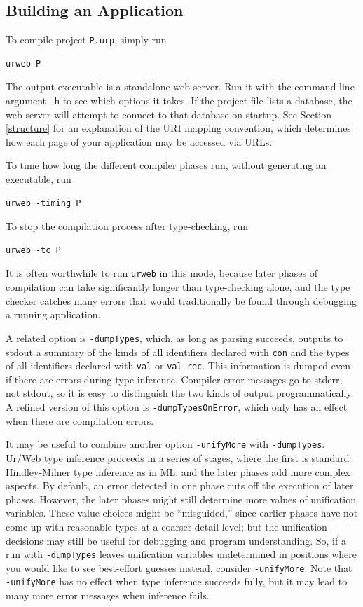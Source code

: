 \documentclass{article}
\newcommand{\cd}[1]{\texttt{#1}}
\begin{document}
\subsection{Building an Application}
\label{sec:building}

To compile project \texttt{P.urp}, simply run
\begin{verbatim}
urweb P
\end{verbatim}
The output executable is a standalone web server.  Run it with the command-line argument \texttt{-h} to see which options it takes.  If the project file lists a database, the web server will attempt to connect to that database on startup.  See Section \ref{structure} for an explanation of the URI mapping convention, which determines how each page of your application may be accessed via URLs.

To time how long the different compiler phases run, without generating an executable, run
\begin{verbatim}
urweb -timing P
\end{verbatim}

To stop the compilation process after type-checking, run
\begin{verbatim}
urweb -tc P
\end{verbatim}
It is often worthwhile to run \cd{urweb} in this mode, because later phases of compilation can take significantly longer than type-checking alone, and the type checker catches many errors that would traditionally be found through debugging a running application.

A related option is \cd{-dumpTypes}, which, as long as parsing succeeds, outputs to stdout a summary of the kinds of all identifiers declared with \cd{con} and the types of all identifiers declared with \cd{val} or \cd{val rec}.  This information is dumped even if there are errors during type inference.  Compiler error messages go to stderr, not stdout, so it is easy to distinguish the two kinds of output programmatically.  A refined version of this option is \cd{-dumpTypesOnError}, which only has an effect when there are compilation errors.

It may be useful to combine another option \cd{-unifyMore} with \cd{-dumpTypes}.  Ur/Web type inference proceeds in a series of stages, where the first is standard Hindley-Milner type inference as in ML, and the later phases add more complex aspects.  By default, an error detected in one phase cuts off the execution of later phases.  However, the later phases might still determine more values of unification variables.  These value choices might be ``misguided,'' since earlier phases have not come up with reasonable types at a coarser detail level; but the unification decisions may still be useful for debugging and program understanding.  So, if a run with \cd{-dumpTypes} leaves unification variables undetermined in positions where you would like to see best-effort guesses instead, consider \cd{-unifyMore}.  Note that \cd{-unifyMore} has no effect when type inference succeeds fully, but it may lead to many more error messages when inference fails.
\end{document}
